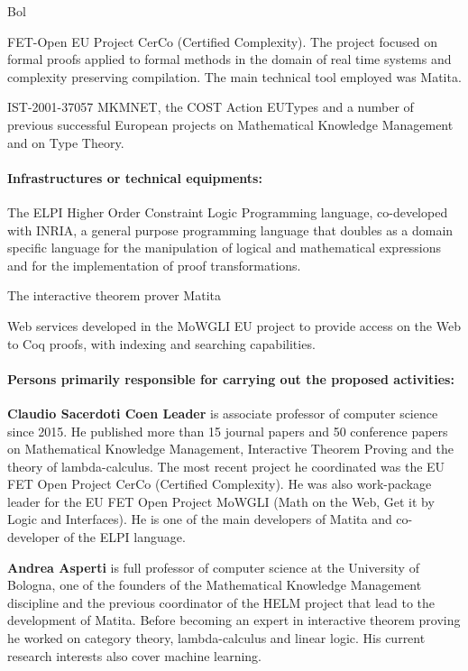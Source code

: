 \begin{sitedescription}{Bol}
\begin{compactitem}
\item FET-Open EU Project CerCo (Certified Complexity). The project focused on formal proofs applied to formal methods in the domain of real time systems and complexity preserving compilation. The main technical tool employed was Matita.

\item IST-2001-37057 MKMNET, the COST Action EUTypes and a number of previous successful European projects on Mathematical Knowledge Management and on Type Theory.
\end{compactitem}

\paragraph*{Infrastructures or technical equipments:}

\begin{compactitem}
\item The ELPI Higher Order Constraint Logic Programming language, co-developed with INRIA, a general purpose programming language that doubles as a domain specific language for the manipulation of logical and mathematical expressions and for the implementation of proof transformations.
\item The interactive theorem prover Matita
\item Web services developed in the MoWGLI EU project to provide access on the Web to Coq proofs, with indexing and searching capabilities.
\end{compactitem}

\paragraph*{Persons primarily responsible for carrying out the proposed activities:}

\begin{compactitem}
\item \textbf{Claudio Sacerdoti Coen Leader} is associate professor of computer science since 2015. He published more than 15 journal papers and 50 conference papers on Mathematical Knowledge Management, Interactive Theorem Proving and the theory of lambda-calculus. The most recent project he coordinated was the EU FET Open Project CerCo (Certified Complexity). He was also work-package leader for the EU FET Open Project MoWGLI (Math on the Web, Get it by Logic and Interfaces). He is one of the main developers of Matita and co-developer of the ELPI language.

\item \textbf{Andrea Asperti} is full professor of computer science at the University of Bologna, one of the founders of the Mathematical Knowledge Management discipline and the previous coordinator of the HELM project that lead to the development of Matita. Before becoming an expert in interactive theorem proving he worked on category theory, lambda-calculus and linear logic. His current research interests also cover machine learning.
\end{compactitem}

\end{sitedescription}

